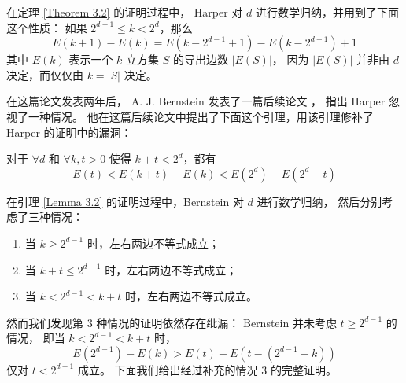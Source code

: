 在定理 \ref{Theorem 3.2} 的证明过程中，
Harper 对 $d$ 进行数学归纳，并用到了下面这个性质：
如果 $2^{d - 1} \le k < 2^d$，那么
\begin{equation}
E(k + 1) - E(k) = E(k - 2^{d - 1} + 1) - E(k - 2^{d - 1}) + 1
\end{equation}
其中 $E(k)$ 表示一个 $k$-立方集 $S$ 的导出边数 $|E(S)|$，
因为 $|E(S)|$ 并非由 $d$ 决定，而仅仅由 $k = |S|$ 决定。

在这篇论文发表两年后，
A. J. Bernstein 发表了一篇后续论文 \cite{Bernstein.1967}，
指出 Harper 忽视了一种情况。
他在这篇后续论文中提出了下面这个引理，用该引理修补了 Harper 的证明中的漏洞：

\begin{lemma}
\label{Lemma 3.2}
对于 $\forall d$ 和 $\forall k, t > 0$ 使得 $k + t < 2^d$，都有
\begin{equation}
E(t) < E(k + t) − E(k) < E(2^d) − E(2^d − t)
\end{equation}
\end{lemma}

在引理 \ref{Lemma 3.2} 的证明过程中，Bernstein 对 $d$ 进行数学归纳，
然后分别考虑了三种情况：
\begin{enumerate}[(1)]
	\item 当 $k \ge 2^{d − 1}$ 时，左右两边不等式成立；
	\item 当 $k + t \le 2^{d − 1}$ 时，左右两边不等式成立；
	\item 当 $k < 2^{d - 1} < k + t$ 时，左右两边不等式成立。
\end{enumerate}

然而我们发现第 3 种情况的证明依然存在纰漏：
Bernstein 并未考虑 $t \ge 2^{d − 1}$ 的情况，
即当 $k < 2^{d − 1} < k + t$ 时，
\begin{equation}
E(2^{d − 1}) − E(k) > E(t) − E(t − (2^{d − 1} − k))
\end{equation}
仅对 $t < 2^{d - 1}$ 成立。
下面我们给出经过补充的情况 3 的完整证明。


